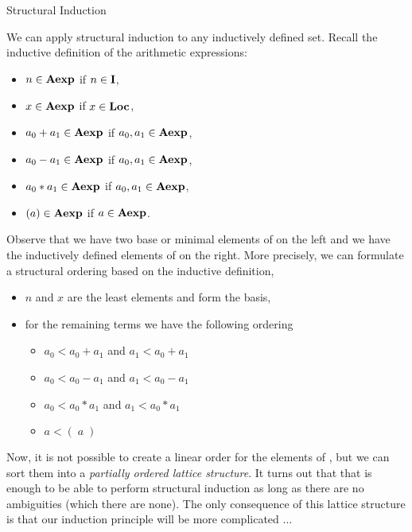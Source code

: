 \documentclass{beamer}
\begin{document}
\begin{frame}{Structural Induction}

\scriptsize
We can apply structural induction to any inductively defined set. Recall
the inductive definition of the arithmetic expressions:

\begin{minipage}[t]{2in}
\begin{itemize}
\item $n \in  \mbox{\bf Aexp}$ if $n \in \mbox{\bf I}$,
\item $x \in \mbox{\bf Aexp}$ if $x\in \mbox{\bf Loc}$,
\end{itemize}
\end{minipage}
\begin{minipage}[t]{2in}
\begin{itemize}
\item $a_0 + a_1 \in \mbox{\bf Aexp}$ if $a_0, a_1 \in \mbox{\bf Aexp}$,
\item $a_0 - a_1 \in \mbox{\bf Aexp}$ if $a_0, a_1 \in \mbox{\bf Aexp}$,
\item $a_0 * a_1 \in \mbox{\bf Aexp}$ if $a_0, a_1 \in \mbox{\bf Aexp}$,
\item $( a ) \in \mbox{\bf Aexp}$ if $a \in \mbox{\bf Aexp}$.
\end{itemize}
\end{minipage}

\vspace{.1in}


Observe that we have two base or minimal elements of  on the left and we have the
inductively defined elements of  on the right.  More precisely, we can formulate a structural
ordering based on the inductive definition,
\begin{itemize}
\item $n$ and $x$ are the least elements and form the basis,
\item for the remaining terms we have the following ordering
\begin{itemize}\scriptsize
\item $a_0 < a_0 + a_1$ and $a_1 < a_0 + a_1$
\item $a_0 < a_0 - a_1$ and $a_1 < a_0 - a_1$
\item $a_0 < a_0 * a_1$ and $a_1 < a_0 * a_1$
\item $a < (\; a\;)$
\end{itemize}
\end{itemize}
Now, it is not possible to create a linear order for the elements of , but we can sort them into
a {\em partially ordered lattice structure}.  It turns out that that is enough to be able to perform structural
induction as long as there are no ambiguities (which there are none).  The only consequence of this
lattice structure is that our induction principle will be more complicated $\dots$


\end{frame}
\end{document}
